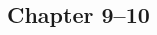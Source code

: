 \documentclass{formulae}
\begin{document}
\begin{multicols*}{2}

    \section{Chapter 9--10}
    

\end{multicols*}
\end{document}
